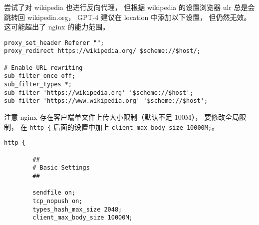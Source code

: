 尝试了对 wikipedia 也进行反向代理， 但根据 wikipedia 的设置浏览器 ulr 总是会跳转回 wikipedia.org， GPT-4 建议在 location 中添加以下设置， 但仍然无效。 这可能超出了 nginx 的能力范围。
\begin{lstlisting}[language=none]
proxy_set_header Referer "";
proxy_redirect https://wikipedia.org/ $scheme://$host/;

# Enable URL rewriting
sub_filter_once off;
sub_filter_types *;
sub_filter 'https://wikipedia.org' '$scheme://$host';
sub_filter 'https://www.wikipedia.org' '$scheme://$host';
\end{lstlisting}

注意 nginx 存在客户端单文件上传大小限制（默认不足 100M）， 要修改全局限制， 在 \verb`http {` 后面的设置中加上 \verb`client_max_body_size 10000M;`。
\begin{lstlisting}[language=none]
http {

        ##
        # Basic Settings
        ##

        sendfile on;
        tcp_nopush on;
        types_hash_max_size 2048;
        client_max_body_size 10000M;
\end{lstlisting}

